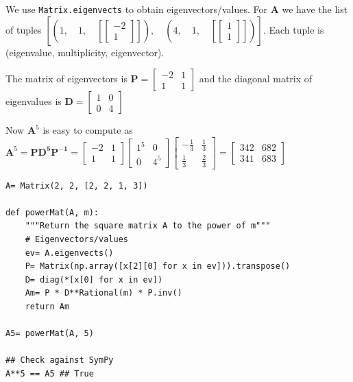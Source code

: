 We use \sympy \texttt{Matrix.eigenvects} to obtain eigenvectors/values.  For \textbf{A}
we have the list of tuples $\left [ \left ( 1, \quad 1, \quad \left [ \left[\begin{matrix}-2\\1\end{matrix}\right]\right ]\right ), \quad \left ( 4, \quad 1, \quad \left [ \left[\begin{matrix}1\\1\end{matrix}\right]\right ]\right )\right ]$.
Each tuple is (eigenvalue, multiplicity, eigenvector).

The matrix of eigenvectors is $\mathbf{P} = \left[\begin{matrix}-2 & 1\\1 & 1\end{matrix}\right]$
and the diagonal matrix of eigenvalues is $\mathbf{D} = \left[\begin{matrix}1 & 0\\0 & 4\end{matrix}\right]$

Now $\mathbf{A}^5$ is easy to compute as $\mathbf{A}^5 = \mathbf{P D^5 P^{-1}} =
\left[\begin{matrix}-2 & 1\\1 & 1\end{matrix}\right]
\left[\begin{matrix}1^5 & 0\\0 & 4^5\end{matrix}\right]
\left[\begin{matrix}- \frac{1}{3} & \frac{1}{3}\\\frac{1}{3} & \frac{2}{3}\end{matrix}\right] =
\left[\begin{matrix}342 & 682\\341 & 683\end{matrix}\right]$

\begin{verbatim}
A= Matrix(2, 2, [2, 2, 1, 3])

def powerMat(A, m):
    """Return the square matrix A to the power of m"""
    # Eigenvectors/values
    ev= A.eigenvects()
    P= Matrix(np.array([x[2][0] for x in ev])).transpose()
    D= diag(*[x[0] for x in ev])
    Am= P * D**Rational(m) * P.inv()
    return Am

A5= powerMat(A, 5)
    
## Check against SymPy
A**5 == A5 ## True
\end{verbatim}

